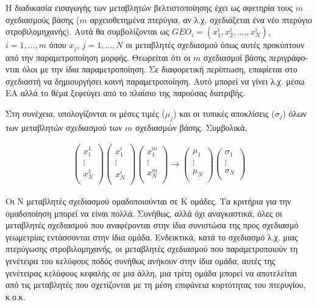 Η διαδικασία εισαγωγής των μεταβλητών βελτιστοποίησης έχει ως αφετηρία τους $m$ σχεδιασμούς βάσης ($m$ αρχειοθετημένα πτερύγια, αν λ.χ. σχεδιάζεται ένα νέο πτερύγιο στροβιλομηχανής). Αυτά θα συμβολίζονται ως $GEO_i=(x_1^i,x_2^i,....,x_N^i)$, $i\!=\!1,...,m$ όπου $x_j$, $j=1,...,N$ οι μεταβλητές σχεδιασμού όπως αυτές προκύπτουν από την παραμετροποίηση μορφής. Θεωρείται ότι οι $m$ σχεδιασμοί βάσης περιγράφο-νται όλοι με την ίδια παραμετροποίηση. Σε διαφορετική περίπτωση, επαφίεται στο σχεδιαστή να δημιουργήσει κοινή παραμετροποίηση. Αυτό μπορεί να γίνει λ.χ. μέσω ΕΑ αλλά το θέμα ξεφεύγει από το πλαίσιο της παρούσας διατριβής.     

Στη συνέχεια, υπολογίζονται οι μέσες τιμές ($\mu _j$) και οι τυπικές αποκλίσεις ($\sigma _j$) όλων των μεταβλητών σχεδιασμού των $m$ σχεδιασμών βάσης. Συμβολικά,
  
\begin{eqnarray}
		\left( {\begin{array}{c}
 		x_1^1  \\
 		\vdots  \\
 		x_N^1	\\
 		\end{array} } \right) 
 		\left( {\begin{array}{c}
 		x_1^i  \\
 		\vdots  \\
 		x_N^i	\\
 		\end{array} } \right)
 		\left( {\begin{array}{c}
 		x_1^m  \\
 		\vdots  \\
 		x_N^m	\\
 		\end{array} } \right) \rightarrow
		\left( {\begin{array}{c}
 		\mu _1  \\
 		\vdots  \\
 		\mu _N  \\
 		\end{array} } \right)
		\left( {\begin{array}{c}
 		\sigma _1  \\
 		\vdots  \\
 		\sigma _N  \\
 		\end{array} } \right)
   \label{cdf-matrix} 
\end{eqnarray}

Οι Ν μεταβλητές σχεδιασμού ομαδοποιούνται σε Κ ομάδες. Τα κριτήρια για την ομαδοποίηση μπορεί να είναι πολλά. Συνήθως, αλλά όχι αναγκαστικά, όλες οι μεταβλητές σχεδιασμού που αναφέρονται στην ίδια συνιστώσα της προς σχεδιασμό γεωμετρίας εντάσσονται στην ίδια ομάδα. Ενδεικτικά, κατά το σχεδιασμό λ.χ. μιας πτερύγωσης στροβιλομηχανής, οι μεταβλητές σχεδιασμού που παραμετροποιούν τη γενέτειρα του κελύφους ποδός συνήθως ανήκουν στην ίδια ομάδα, αυτές της γενέτειρας κελύφους κεφαλής σε μια άλλη, μια τρίτη ομάδα μπορεί να αποτελείται από τις μεταβλητές που σχετίζονται με τη μέση επιφάνεια κυρτότητας του πτερυγίου, κ.ο.κ. 

